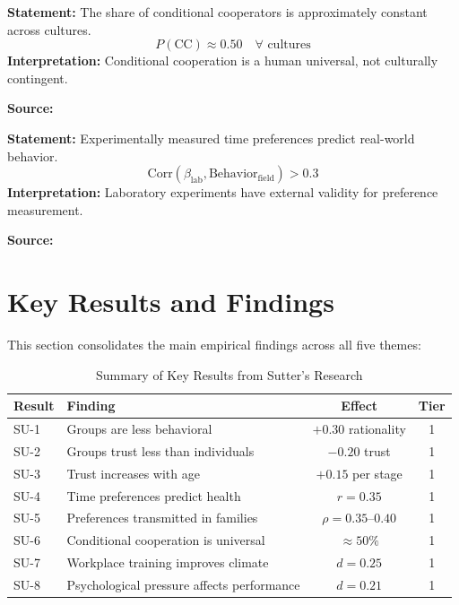 \begin{tcolorbox}[colback=gray!5!white, colframe=gray!75!black,
    title=Axiom SU-5: Conditional Cooperation Universality]
\textbf{Statement:} The share of conditional cooperators is approximately constant across cultures.
\begin{equation}
P(\text{CC}) \approx 0.50 \quad \forall \text{ cultures}
\end{equation}
\textbf{Interpretation:} Conditional cooperation is a human universal, not culturally contingent.

\textbf{Source:} \citet{kocher2008conditional}
\end{tcolorbox}

\begin{tcolorbox}[colback=gray!5!white, colframe=gray!75!black,
    title=Axiom SU-6: Lab-Field Validity]
\textbf{Statement:} Experimentally measured time preferences predict real-world behavior.
\begin{equation}
\text{Corr}(\beta_{\text{lab}}, \text{Behavior}_{\text{field}}) > 0.3
\end{equation}
\textbf{Interpretation:} Laboratory experiments have external validity for preference measurement.

\textbf{Source:} \citet{sutter2013impatience}
\end{tcolorbox}


\section{Key Results and Findings}
\label{sec:su-results}

This section consolidates the main empirical findings across all five themes:

\begin{table}[htbp]
\centering
\caption{Summary of Key Results from Sutter's Research}
\label{tab:su-key-results}
\renewcommand{\arraystretch}{1.3}
\begin{tabular}{@{}llcc@{}}
\toprule
\textbf{Result} & \textbf{Finding} & \textbf{Effect} & \textbf{Tier} \\
\midrule
SU-1 & Groups are less behavioral & $+0.30$ rationality & 1 \\
SU-2 & Groups trust less than individuals & $-0.20$ trust & 1 \\
SU-3 & Trust increases with age & $+0.15$ per stage & 1 \\
SU-4 & Time preferences predict health & $r = 0.35$ & 1 \\
SU-5 & Preferences transmitted in families & $\rho = 0.35$--$0.40$ & 1 \\
SU-6 & Conditional cooperation is universal & $\approx 50\%$ & 1 \\
SU-7 & Workplace training improves climate & $d = 0.25$ & 1 \\
SU-8 & Psychological pressure affects performance & $d = 0.21$ & 1 \\
\bottomrule
\end{tabular}
\end{table}



